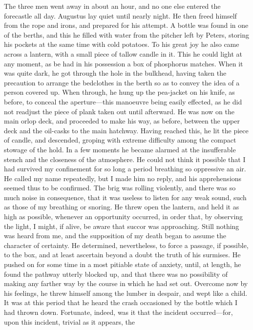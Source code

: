 The three men went away in about an hour, and no one else entered the
forecastle all day. Augustus lay quiet until nearly night. He then freed himself
from the rope and irons, and prepared for his attempt. A bottle was found in one
of the berths, and this he filled with water from the pitcher left by Peters,
storing his pockets at the same time with cold potatoes. To his great joy he
also came across a lantern, with a small piece of tallow candle in it. This he
could light at any moment, as be had in his possession a box of phosphorus
matches. When it was quite dark, he got through the hole in the bulkhead, having
taken the precaution to arrange the bedclothes in the berth so as to convey the
idea of a person covered up. When through, he hung up the pea-jacket on his
knife, as before, to conceal the aperture---this manoeuvre being easily
effected, as he did not readjust the piece of plank taken out until afterward.
He was now on the main orlop deck, and proceeded to make his way, as before,
between the upper deck and the oil-casks to the main hatchway. Having reached
this, he lit the piece of candle, and descended, groping with extreme difficulty
among the compact stowage of the hold. In a few moments he became alarmed at the
insufferable stench and the closeness of the atmosphere. He could not think it
possible that I had survived my confinement for so long a period breathing so
oppressive an air. He called my name repeatedly, but I made him no reply, and
his apprehensions seemed thus to be confirmed. The brig was rolling violently,
and there was so much noise in consequence, that it was useless to listen for
any weak sound, such as those of my breathing or snoring. He threw open the
lantern, and held it as high as possible, whenever an opportunity occurred, in
order that, by observing the light, I might, if alive, be aware that succor was
approaching. Still nothing was heard from me, and the supposition of my death
began to assume the character of certainty. He determined, nevertheless, to
force a passage, if possible, to the box, and at least ascertain beyond a doubt
the truth of his surmises. He pushed on for some time in a most pitiable state
of anxiety, until, at length, he found the pathway utterly blocked up, and that
there was no possibility of making any farther way by the course in which he had
set out. Overcome now by his feelings, he threw himself among the lumber in
despair, and wept like a child. It was at this period that he heard the crash
occasioned by the bottle which I had thrown down. Fortunate, indeed, was it that
the incident occurred---for, upon this incident, trivial as it appears, the
